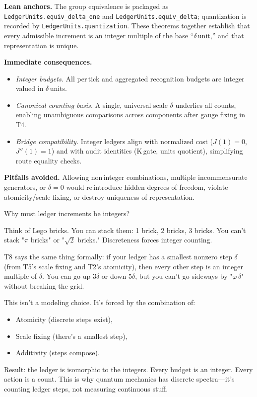 \documentclass[11pt]{article}
\begin{document}
\textbf{Lean anchors.} The group equivalence is packaged as \texttt{LedgerUnits.equiv\_delta\_one} and \texttt{LedgerUnits.equiv\_delta}; quantization is recorded by \texttt{LedgerUnits.quantization}. These theorems together establish that every admissible increment is an integer multiple of the base “$\delta$\,unit,” and that representation is unique.

\textbf{Immediate consequences.}
\begin{itemize}[leftmargin=*]
  \item \emph{Integer budgets.} All per\,tick and aggregated recognition budgets are integer\,valued in $\delta$\,units.
  \item \emph{Canonical counting basis.} A single, universal scale $\delta$ underlies all counts, enabling unambiguous comparisons across components after gauge fixing in T4.
  \item \emph{Bridge compatibility.} Integer ledgers align with normalized cost ($J(1)=0$, $J''(1)=1$) and with audit identities (K\,gate, units quotient), simplifying route equality checks.
\end{itemize}

\textbf{Pitfalls avoided.} Allowing non\,integer combinations, multiple incommensurate generators, or $\delta=0$ would re\,introduce hidden degrees of freedom, violate atomicity/scale fixing, or destroy uniqueness of representation.

\begin{intuitionbox}
Why must ledger increments be integers?

Think of Lego bricks. You can stack them: 1 brick, 2 bricks, 3 bricks. You can't stack "$\pi$ bricks" or "$\sqrt{2}$ bricks." Discreteness forces integer counting.

T8 says the same thing formally: if your ledger has a smallest nonzero step $\delta$ (from T5's scale fixing and T2's atomicity), then every other step is an integer multiple of $\delta$. You can go up $3\delta$ or down $5\delta$, but you can't go sideways by "$\varphi\,\delta$" without breaking the grid.

This isn't a modeling choice. It's forced by the combination of:
\begin{itemize}
  \item Atomicity (discrete steps exist),
  \item Scale fixing (there's a smallest step),
  \item Additivity (steps compose).
\end{itemize}

Result: the ledger is isomorphic to the integers. Every budget is an integer. Every action is a count. This is why quantum mechanics has discrete spectra—it's counting ledger steps, not measuring continuous stuff.
\end{intuitionbox}
\end{document}
